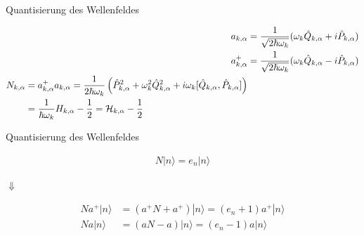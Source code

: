 \documentclass{beamer}
\begin{document}
\begin{frame}[t]{Quantisierung des Wellenfeldes}
	\vspace*{-0.5cm}
	\begin{center}
		\begin{minipage}{0.35\textwidth}
			\begin{align*}
			a_{k,\alpha} &= \frac{1}{\sqrt{2 \hbar \omega_k}} (\omega_k \hat{Q}_{k,\alpha} + i\hat{P}_{k,\alpha}) \\
			a^+_{k,\alpha} &= \frac{1}{\sqrt{2 \hbar \omega_k}} (\omega_k \hat{Q}_{k,\alpha} - i\hat{P}_{k,\alpha})\\
			\begin{split}
			N_{k,\alpha} &= a^+_{k,\alpha} a_{k,\alpha} = \frac{1}{2 \hbar \omega_k} \left(\hat{P}_{k,\alpha}^2 + \omega_k^2 \hat{Q}_{k,\alpha}^2 + i\omega_k [\hat{Q}_{k,\alpha},\hat{P}_{k,\alpha}] \right) \\
			&= \frac{1}{ \hbar \omega_k } H_{k,\alpha} - \frac{1}{2} = {\cal H}_{k,\alpha} - \frac{1}{2}
			\end{split}
			\end{align*}
		\end{minipage}
	\end{center}
\end{frame}

\begin{frame}[t]{Quantisierung des Wellenfeldes}
	\vspace*{-0.5cm}
	\begin{center}
		\begin{minipage}{0.35\textwidth}
			\begin{align*}
				N|n\rangle = e_n|n\rangle
			\end{align*}
		\end{minipage}
		
		\vspace*{0.5cm}
		$\Downarrow$
		
		\begin{minipage}{0.35\textwidth}
			\begin{align*}
			Na^+|n\rangle &= (a^+N + a^+)|n\rangle = (e_n + 1)a^+|n\rangle \\
			Na|n\rangle &= (aN - a)|n\rangle = (e_n - 1)a|n\rangle
			\end{align*}
		\end{minipage}
	\end{center}
\end{frame}
\end{document}
